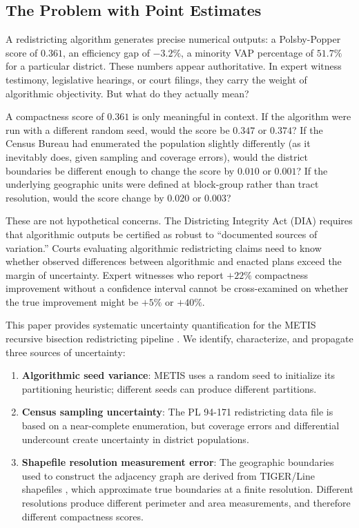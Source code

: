 
\subsection{The Problem with Point Estimates}

A redistricting algorithm generates precise numerical outputs: a
Polsby-Popper score of $0.361$, an efficiency gap of $-3.2\%$, a
minority VAP percentage of $51.7\%$ for a particular district. These
numbers appear authoritative. In expert witness testimony, legislative
hearings, or court filings, they carry the weight of algorithmic
objectivity. But what do they actually mean?

A compactness score of $0.361$ is only meaningful in context. If the
algorithm were run with a different random seed, would the score be
$0.347$ or $0.374$? If the Census Bureau had enumerated the population
slightly differently (as it inevitably does, given sampling and coverage
errors), would the district boundaries be different enough to change the
score by $0.010$ or $0.001$? If the underlying geographic units were
defined at block-group rather than tract resolution, would the score
change by $0.020$ or $0.003$?

These are not hypothetical concerns. The Districting Integrity Act
(DIA) \citep{b02paper} requires that algorithmic outputs be certified
as robust to ``documented sources of variation.'' Courts evaluating
algorithmic redistricting claims need to know whether observed
differences between algorithmic and enacted plans exceed the margin of
uncertainty. Expert witnesses who report $+22\%$ compactness improvement
without a confidence interval cannot be cross-examined on whether the
true improvement might be $+5\%$ or $+40\%$.

This paper provides systematic uncertainty quantification for the
METIS recursive bisection redistricting pipeline \citep{b1paper}.
We identify, characterize, and propagate three sources of uncertainty:

\begin{enumerate}
  \item \textbf{Algorithmic seed variance}: METIS uses a random seed
    to initialize its partitioning heuristic; different seeds can
    produce different partitions.

  \item \textbf{Census sampling uncertainty}: The PL 94-171
    redistricting data file \citep{pl94171} is based on a near-complete
    enumeration, but coverage errors and differential undercount create
    uncertainty in district populations.

  \item \textbf{Shapefile resolution measurement error}: The geographic
    boundaries used to construct the adjacency graph are derived from
    TIGER/Line shapefiles \citep{tiger-census}, which approximate true
    boundaries at a finite resolution. Different resolutions produce
    different perimeter and area measurements, and therefore different
    compactness scores.
\end{enumerate}

